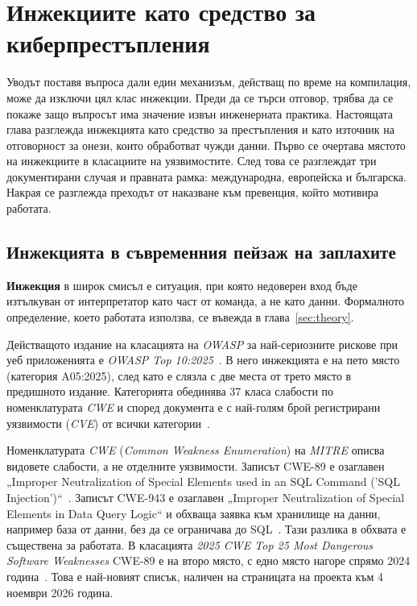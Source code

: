 \section{Инжекциите като средство за киберпрестъпления}
\label{sec:cybercrime}

Уводът поставя въпроса дали един механизъм, действащ по време на компилация, може
да изключи цял клас инжекции. Преди да се търси отговор, трябва да се покаже защо
въпросът има значение извън инженерната практика. Настоящата глава разглежда
инжекцията като средство за престъпления и като източник на отговорност за онези,
които обработват чужди данни. Първо се очертава мястото на инжекциите в
класациите на уязвимостите. След това се разглеждат три документирани случая и
правната рамка: международна, европейска и българска. Накрая се разглежда преходът
от наказване към превенция, който мотивира работата.

\subsection{Инжекцията в съвременния пейзаж на заплахите}
\label{sec:cybercrime-landscape}

\textbf{Инжекция} в широк смисъл е ситуация, при която недоверен вход бъде
изтълкуван от интерпретатор като част от команда, а не като данни. Формалното
определение, което работата използва, се въвежда в глава~\ref{sec:theory}.

Действащото издание на класацията на \textit{OWASP} за най-сериозните рискове при
уеб приложенията е \textit{OWASP Top 10:2025}~\cite{owasp_top10}. В него
инжекцията е на пето място (категория A05:2025), след като е слязла с две места
от трето място в предишното издание. Категорията обединява 37 класа слабости по
номенклатурата \textit{CWE} и според документа е с най-голям брой регистрирани
уязвимости (\textit{CVE}) от всички категории~\cite{owasp_a05_injection}.

Номенклатурата \textit{CWE} (\textit{Common Weakness Enumeration}) на \textit{MITRE}
описва видовете слабости, а не отделните уязвимости. Записът CWE-89 е озаглавен
„Improper Neutralization of Special Elements used in an SQL Command ('SQL
Injection')“~\cite{cwe89}. Записът CWE-943 е озаглавен „Improper Neutralization of
Special Elements in Data Query Logic“ и обхваща заявка към хранилище на данни,
например база от данни, без да се ограничава до SQL~\cite{cwe943}. Тази разлика в
обхвата е съществена за работата. В класацията \textit{2025 CWE Top 25 Most
Dangerous Software Weaknesses} CWE-89 е на второ място, с едно място нагоре спрямо
2024 година~\cite{cwe_top25_2025}. Това е най-новият списък, наличен на страницата
на проекта към 4 ноември 2026 година.

